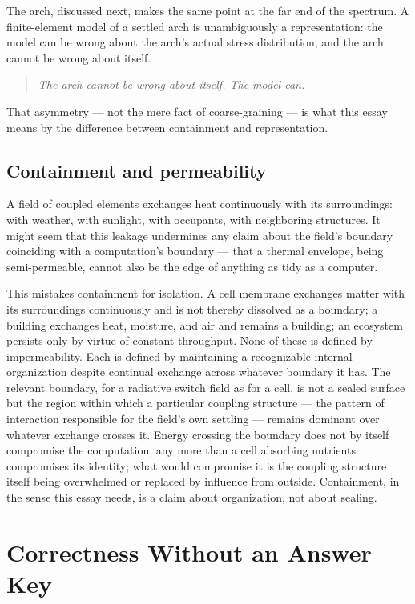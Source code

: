 \documentclass[11pt]{article}
\begin{document}
The arch, discussed next, makes the same point at the far end of the spectrum. A finite-element model of a settled arch is unambiguously a representation: the model can be wrong about the arch's actual stress distribution, and the arch cannot be wrong about itself.

\begin{quote}
\itshape
The arch cannot be wrong about itself. The model can.
\end{quote}

\noindent That asymmetry --- not the mere fact of coarse-graining --- is what this essay means by the difference between containment and representation.

\subsection{Containment and permeability}

A field of coupled elements exchanges heat continuously with its surroundings: with weather, with sunlight, with occupants, with neighboring structures. It might seem that this leakage undermines any claim about the field's boundary coinciding with a computation's boundary --- that a thermal envelope, being semi-permeable, cannot also be the edge of anything as tidy as a computer.

This mistakes containment for isolation. A cell membrane exchanges matter with its surroundings continuously and is not thereby dissolved as a boundary; a building exchanges heat, moisture, and air and remains a building; an ecosystem persists only by virtue of constant throughput. None of these is defined by impermeability. Each is defined by maintaining a recognizable internal organization despite continual exchange across whatever boundary it has. The relevant boundary, for a radiative switch field as for a cell, is not a sealed surface but the region within which a particular coupling structure --- the pattern of interaction responsible for the field's own settling --- remains dominant over whatever exchange crosses it. Energy crossing the boundary does not by itself compromise the computation, any more than a cell absorbing nutrients compromises its identity; what would compromise it is the coupling structure itself being overwhelmed or replaced by influence from outside. Containment, in the sense this essay needs, is a claim about organization, not about sealing.

\section{Correctness Without an Answer Key}
\end{document}
